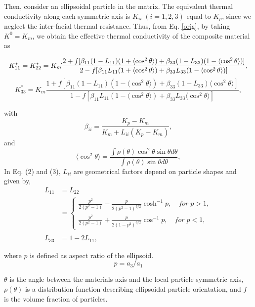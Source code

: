 \documentclass[conference,compsoc]{IEEEtran}
\begin{document}
Then, consider an ellipsoidal particle in the matrix. The equivalent thermal conductivity along each symmetric axis is $K_{ii} \; (i = 1,2,3)$ equal to $K_p$, since we neglect the inter-facial thermal resistance. Thus, from Eq. \ref{orig}, by taking $K^0 = K_m$, we obtain the effective thermal conductivity of the composite material as 
\begin{strip}
\begin{equation}
K_{11}^* = K_{22}^* = K_m \dot \\ \frac{2+f[\beta_{11}(1-L_{11})(1+\langle \cos^2 \theta \rangle)+\beta_{33}(1-L_{33})(1-\langle \cos^2 \theta\rangle)]}{2-f[\beta_{11}L_{11}(1+\langle \cos^2 \theta \rangle)+\beta_{33} L_{33}(1-\langle \cos^2 \theta \rangle)]},
\end{equation}
\begin{equation}
K_{33}^* = K_m \frac{1+f[\beta_{11}(1-L_{11})(1-\langle \cos^2 \theta \rangle)+\beta_{33}(1-L_{33})\langle \cos^2 \theta \rangle]}{1-f[\beta_{11} L_{11} (1- \langle \cos^2 \theta \rangle)+\beta_{33} L_{33} \langle \cos^2 \theta \rangle]},
\end{equation}
\end{strip}
with
\begin{equation}
\label{eq_beta}
\beta_{ii} = \frac{K_p -K_m}{K_m+L_{ii}(K_p-K_m)},
\end{equation}
and 
\begin{equation}
\langle \cos^2 \theta \rangle = \frac{\int \rho(\theta) \cos^2 \theta \sin \theta d\theta}{\int \rho(\theta) \sin \theta d\theta},
\end{equation}
In Eq. (2) and (3), $L_{ii}$ are geometrical factors depend on particle shapes and given by,
\begin{equation}
\label{eq_Lii}
\begin{split}
L_{11} &= L_{22} \\&= \begin{cases} \frac{p^2}{2(p^2-1)}-\frac{p}{2(p^2-1)^{3/2}}\cosh^{-1}p, \quad for\; p > 1, \\
\frac{p^2}{2(p^2-1)}+\frac{p}{2(1-p^2)^{3/2}}\cos^{-1}p, \quad for\; p < 1, \end{cases} \\\\
L_{33} &= 1-2L_{11},
\end{split}
\end{equation}

where $p$ is defined as aspect ratio of the ellipsoid.
\[ p = a_3/a_1\]

$\theta$ is the angle between the materials axis and the local particle symmetric axis, $\rho (\theta)$ is a distribution function describing ellipsoidal particle orientation, and $f$ is the volume fraction of particles.
\end{document}
